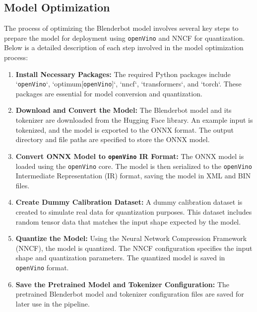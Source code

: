 \documentclass{josis}
\begin{document}
\subsection{Model Optimization}

The process of optimizing the Blenderbot model involves several key steps to prepare the model for deployment using \texttt{openVino} and NNCF for quantization. Below is a detailed description of each step involved in the model optimization process:

\begin{enumerate}
    \item \textbf{Install Necessary Packages:} The required Python packages include `\texttt{openVino}`, `optimum[\texttt{openVino}]`, `nncf`, `transformers`, and `torch`. These packages are essential for model conversion and quantization.

    \item \textbf{Download and Convert the Model:} The Blenderbot model and its tokenizer are downloaded from the Hugging Face library. An example input is tokenized, and the model is exported to the ONNX format. The output directory and file paths are specified to store the ONNX model.

    \item \textbf{Convert ONNX Model to \texttt{openVino} IR Format:} The ONNX model is loaded using the \texttt{openVino} core. The model is then serialized to the \texttt{openVino} Intermediate Representation (IR) format, saving the model in XML and BIN files.

    \item \textbf{Create Dummy Calibration Dataset:} A dummy calibration dataset is created to simulate real data for quantization purposes. This dataset includes random tensor data that matches the input shape expected by the model.

    \item \textbf{Quantize the Model:} Using the Neural Network Compression Framework (NNCF), the model is quantized. The NNCF configuration specifies the input shape and quantization parameters. The quantized model is saved in \texttt{openVino} format.

    \item \textbf{Save the Pretrained Model and Tokenizer Configuration:} The pretrained Blenderbot model and tokenizer configuration files are saved for later use in the pipeline.

\end{enumerate}
\end{document}
